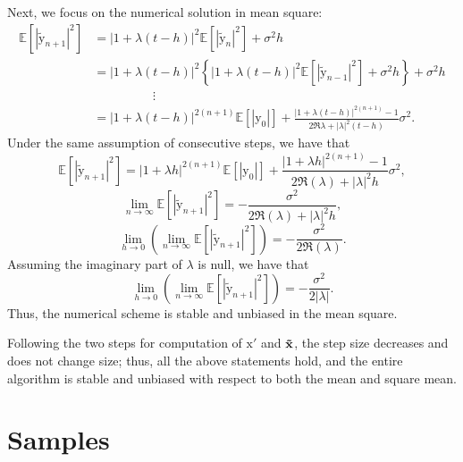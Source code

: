 \documentclass{article}
\newcommand{\x}{\boldsymbol{\mathrm{x}}}
\newcommand{\y}{\boldsymbol{\mathrm{y}}}
\newcommand{\thicktilde}[1]{\mathbf{\Tilde{\text{$#1$}}}}
\newcommand{\xheun}{\thicktilde{\boldsymbol{\mathrm{x}}}}
\begin{document}
Next, we focus on the numerical solution in mean square:
\begin{align*}
\mathbb{E}\left[\left|\tilde{\y}_{n+1}\right|^{2}\right] & =\left|1+\lambda\left(t-h\right)\right|^{2}\mathbb{E}\left[\left|\tilde{\y}_{n}\right|^{2}\right]+\sigma^{2}h\\
 &= \left|1+\lambda\left(t-h\right)\right|^{2}\left\{ \left|1+\lambda\left(t-h\right)\right|^{2}\mathbb{E}\left[\left|\tilde{\y}_{n-1}\right|^{2}\right]+\sigma^{2}h\right\} +\sigma^{2}h\\
 & \hspace{2cm}\vdots \\
 & = \left|1+\lambda\left(t-h\right)\right|^{2\left(n+1\right)}\mathbb{E}\left[\left|\y_{0}\right|\right]+\frac{\left|1+\lambda\left(t-h\right)\right|^{2\left(n+1\right)}-1}{2\Re\lambda+\left|\lambda\right|^{2}\left(t-h\right)}\sigma^{2}.
\end{align*}
Under the same assumption of consecutive steps, we have that
\[
\mathbb{E}\left[\left|\tilde{\y}_{n+1}\right|^{2}\right]=\left|1+\lambda h\right|^{2\left(n+1\right)}\mathbb{E}\left[\left|\y_{0}\right|\right]+\frac{\left|1+\lambda h\right|^{2\left(n+1\right)}-1}{2\Re(\lambda)+\left|\lambda\right|^{2}h}\sigma^{2},
\]
\[
\lim_{n\rightarrow\infty}\mathbb{E}\left[\left|\tilde{\y}_{n+1}\right|^{2}\right]=-\frac{\sigma^{2}}{2\Re(\lambda)+\left|\lambda\right|^{2}h},
\]
\[
\lim_{h\rightarrow0}\left(\lim_{n\rightarrow\infty}\mathbb{E}\left[\left|\tilde{\y}_{n+1}\right|^{2}\right]\right)=-\frac{\sigma^{2}}{2\Re(\lambda)}.
\]
Assuming the imaginary part of $\lambda$ is null, we have that
\[
\lim_{h\rightarrow0}\left(\lim_{n\rightarrow\infty}\mathbb{E}\left[\left|\tilde{\y}_{n+1}\right|^{2}\right]\right)=-\frac{\sigma^{2}}{2\left|\lambda\right|}.
\]
Thus, the numerical scheme is stable and unbiased in the mean square.

Following the two steps for computation of $\x'$ and
$\xheun$, the step size decreases and does not
change size; thus, all the above statements hold, and the entire algorithm is stable and unbiased with respect to both the mean and square mean.

\clearpage
\section{Samples}
\end{document}
